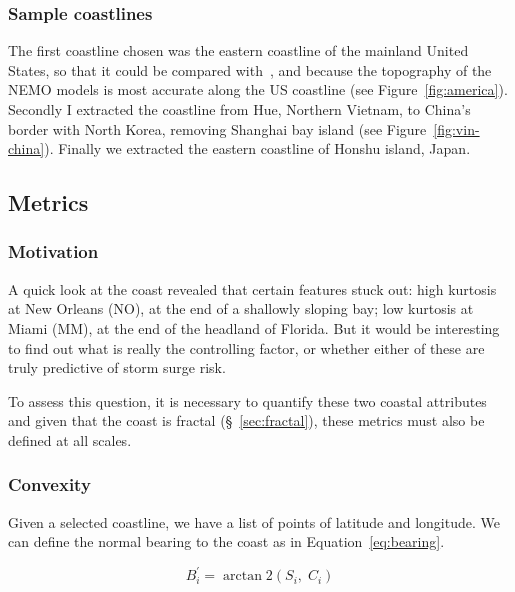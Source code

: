 


\subsubsection{Sample coastlines}
\label{sec:coast-sample}
The first coastline chosen was the eastern coastline of the mainland
United States, so that it could be compared with~\cite{ZannaPreprint},
and because the topography of the NEMO models is most accurate along the
US coastline (see Figure~\ref{fig:america}).
Secondly I extracted the coastline from Hue, Northern Vietnam, to China's
border with North Korea, removing Shanghai bay island (see Figure~\ref{fig:vin-china}).
Finally we extracted the eastern coastline of Honshu island, Japan.



\subsection{Metrics}
\subsubsection{Motivation}
A quick look at the coast revealed that certain features stuck out:
high kurtosis at New Orleans (NO), at the end of a shallowly sloping bay;
low kurtosis at Miami (MM), at the end of the headland of Florida.
But it would be interesting to find out what is really the controlling
factor, or whether either of these are truly predictive of storm surge risk.

To assess this question, it is necessary to quantify these two coastal attributes
and given that the coast is fractal (§~\ref{sec:fractal}), these metrics must also be defined at
all scales.

\subsubsection{Convexity}
\label{sec:convexity}
Given a selected coastline, we have a list of points of latitude and longitude.
We can define the normal bearing to the coast as in Equation~\ref{eq:bearing}.


\begin{equation}
B_i^{\prime}=\operatorname{arctan} 2
\left(S_i,\; C_i\right)
\label{eq:bearing}
\end{equation}


